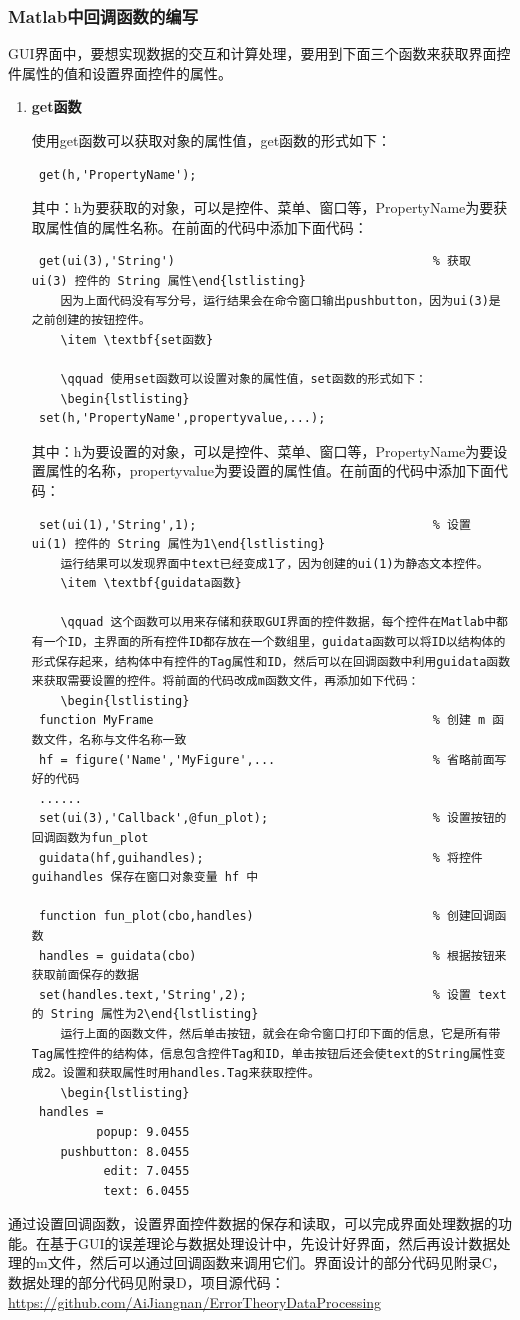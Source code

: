 \subsubsection{Matlab中回调函数的编写}
GUI界面中，要想实现数据的交互和计算处理，要用到下面三个函数来获取界面控件属性的值和设置界面控件的属性。
\begin{enumerate}
	\item \textbf{get函数}

	\qquad 使用get函数可以获取对象的属性值，get函数的形式如下：
	\begin{lstlisting}
 get(h,'PropertyName');\end{lstlisting}
 	其中：h为要获取的对象，可以是控件、菜单、窗口等，PropertyName为要获取属性值的属性名称。在前面的代码中添加下面代码：
	 \begin{lstlisting}
 get(ui(3),'String')									% 获取 ui(3) 控件的 String 属性\end{lstlisting}
 	因为上面代码没有写分号，运行结果会在命令窗口输出pushbutton，因为ui(3)是之前创建的按钮控件。
	\item \textbf{set函数}

	\qquad 使用set函数可以设置对象的属性值，set函数的形式如下：
	\begin{lstlisting}
 set(h,'PropertyName',propertyvalue,...);\end{lstlisting}
 	其中：h为要设置的对象，可以是控件、菜单、窗口等，PropertyName为要设置属性的名称，propertyvalue为要设置的属性值。在前面的代码中添加下面代码：
	 \begin{lstlisting}
 set(ui(1),'String',1);									% 设置 ui(1) 控件的 String 属性为1\end{lstlisting}
 	运行结果可以发现界面中text已经变成1了，因为创建的ui(1)为静态文本控件。
	\item \textbf{guidata函数}

	\qquad 这个函数可以用来存储和获取GUI界面的控件数据，每个控件在Matlab中都有一个ID，主界面的所有控件ID都存放在一个数组里，guidata函数可以将ID以结构体的形式保存起来，结构体中有控件的Tag属性和ID，然后可以在回调函数中利用guidata函数来获取需要设置的控件。将前面的代码改成m函数文件，再添加如下代码：
	\begin{lstlisting}
 function MyFrame										% 创建 m 函数文件，名称与文件名称一致
 hf = figure('Name','MyFigure',...						% 省略前面写好的代码
 ......
 set(ui(3),'Callback',@fun_plot);						% 设置按钮的回调函数为fun_plot
 guidata(hf,guihandles);								% 将控件 guihandles 保存在窗口对象变量 hf 中

 function fun_plot(cbo,handles)							% 创建回调函数
 handles = guidata(cbo)									% 根据按钮来获取前面保存的数据
 set(handles.text,'String',2);							% 设置 text 的 String 属性为2\end{lstlisting}
 	运行上面的函数文件，然后单击按钮，就会在命令窗口打印下面的信息，它是所有带Tag属性控件的结构体，信息包含控件Tag和ID，单击按钮后还会使text的String属性变成2。设置和获取属性时用handles.Tag来获取控件。
	\begin{lstlisting}
 handles = 
         popup: 9.0455
    pushbutton: 8.0455
          edit: 7.0455
          text: 6.0455\end{lstlisting}
\end{enumerate}

通过设置回调函数，设置界面控件数据的保存和读取，可以完成界面处理数据的功能。在基于GUI的误差理论与数据处理设计中，先设计好界面，然后再设计数据处理的m文件，然后可以通过回调函数来调用它们。界面设计的部分代码见附录C，数据处理的部分代码见附录D，项目源代码：\url{https://github.com/AiJiangnan/ErrorTheoryDataProcessing}